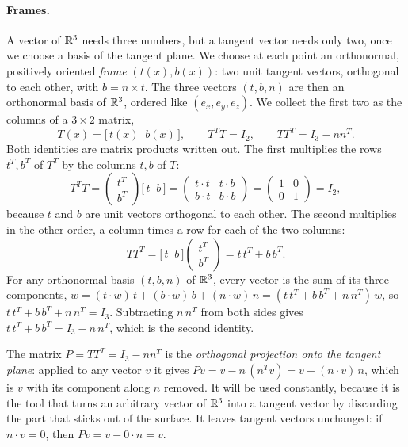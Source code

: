 \paragraph{Frames.} A vector of $\mathbb{R}^3$ needs three numbers, but a tangent vector needs only two, once we choose a basis of the tangent plane. We choose at each point an orthonormal, positively oriented \emph{frame} $(t(x), b(x))$: two unit tangent vectors, orthogonal to each other, with $b = n \times t$. The three vectors $(t, b, n)$ are then an orthonormal basis of $\mathbb{R}^3$, ordered like $(e_x, e_y, e_z)$. We collect the first two as the columns of a $3 \times 2$ matrix,
\begin{equation}
\label{eqn:frame}
T(x) = \big[\, t(x) \;\; b(x) \,\big], \qquad T^T T = I_2, \qquad T T^T = I_3 - n n^T .
\end{equation}
Both identities are matrix products written out. The first multiplies the rows $t^T, b^T$ of $T^T$ by the columns $t, b$ of $T$:
\begin{equation*}
T^T T = \begin{pmatrix} t^T \\ b^T \end{pmatrix} \big[\, t \;\; b \,\big] = \begin{pmatrix} t\cdot t & t\cdot b \\ b\cdot t & b\cdot b \end{pmatrix} = \begin{pmatrix} 1 & 0 \\ 0 & 1 \end{pmatrix} = I_2 ,
\end{equation*}
because $t$ and $b$ are unit vectors orthogonal to each other. The second multiplies in the other order, a column times a row for each of the two columns:
\begin{equation*}
T T^T = \big[\, t \;\; b \,\big] \begin{pmatrix} t^T \\ b^T \end{pmatrix} = t\,t^T + b\,b^T .
\end{equation*}
For any orthonormal basis $(t, b, n)$ of $\mathbb{R}^3$, every vector is the sum of its three components, $w = (t\cdot w)\,t + (b\cdot w)\,b + (n\cdot w)\,n = (t\,t^T + b\,b^T + n\,n^T)\, w$, so $t\,t^T + b\,b^T + n\,n^T = I_3$. Subtracting $n\,n^T$ from both sides gives $t\,t^T + b\,b^T = I_3 - n\,n^T$, which is the second identity.

The matrix $P = T T^T = I_3 - n n^T$ is the \emph{orthogonal projection onto the tangent plane}: applied to any vector $v$ it gives $P v = v - n\,(n^T v) = v - (n\cdot v)\, n$, which is $v$ with its component along $n$ removed. It will be used constantly, because it is the tool that turns an arbitrary vector of $\mathbb{R}^3$ into a tangent vector by discarding the part that sticks out of the surface. It leaves tangent vectors unchanged: if $n\cdot v = 0$, then $P v = v - 0\cdot n = v$.

